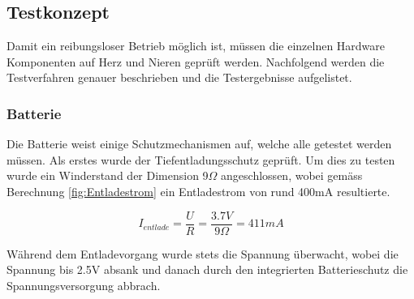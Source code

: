 \subsection{Testkonzept}
Damit ein reibungsloser Betrieb möglich ist, müssen die einzelnen Hardware Komponenten auf Herz und Nieren geprüft werden. Nachfolgend werden die Testverfahren genauer beschrieben und die Testergebnisse aufgelistet.

\subsubsection{Batterie}
Die Batterie weist einige Schutzmechanismen auf, welche alle getestet werden müssen. Als erstes wurde der Tiefentladungsschutz geprüft. Um dies zu testen wurde ein Winderstand der Dimension 9$\Omega$ angeschlossen, wobei gemäss Berechnung \ref{fig:Entladestrom} ein Entladestrom von rund 400mA resultierte.

\begin{equation}
I_{entlade}=\frac{U}{R}=\frac{3.7V}{9\Omega }= 411mA
\label{fig:Entladestrom}
\end{equation}

Während dem Entladevorgang wurde stets die Spannung überwacht, wobei die Spannung bis 2.5V absank und danach durch den integrierten Batterieschutz die Spannungsversorgung abbrach.

